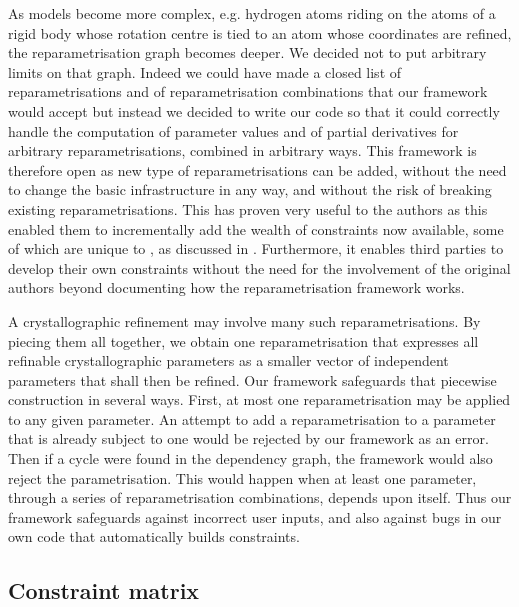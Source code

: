 \documentclass[pdf]{iucr}
\begin{document}
As models become more complex, e.g. hydrogen atoms riding on the atoms of a rigid body whose rotation centre is tied to an atom whose coordinates are refined, the reparametrisation graph becomes deeper. We decided not to put arbitrary limits on that graph. Indeed we could have made a closed list of reparametrisations and of reparametrisation combinations  that our framework would accept but instead we decided to write our code so that it could correctly handle the computation of parameter values and of partial derivatives for arbitrary reparametrisations, combined in arbitrary ways. This framework is therefore open as new type of reparametrisations can be added, without the need to change the basic infrastructure in any way, and without the risk of breaking existing reparametrisations. This has proven very useful to the authors as this enabled them to incrementally add the wealth of constraints now available, some of which are unique to \olexrefine, as discussed in . Furthermore, it enables third parties to develop their own constraints without the need for the involvement of the original authors beyond documenting how the reparametrisation framework works.

A crystallographic refinement may involve many such reparametrisations. By piecing them all together, we obtain one reparametrisation that expresses all refinable crystallographic parameters as a smaller vector of independent parameters that shall then be refined. Our framework safeguards that piecewise construction in several ways. First, at most one reparametrisation may be applied to any given parameter. An attempt to add a reparametrisation to a parameter that is already subject to one would be rejected by our framework as an error. Then if a cycle were found in the dependency graph, the framework would also reject the parametrisation. This would happen when at least one parameter, through a series of reparametrisation combinations, depends upon itself. Thus our framework safeguards against incorrect user inputs, and also against bugs in our own code that automatically builds constraints.

\subsection{Constraint matrix}
\end{document}
